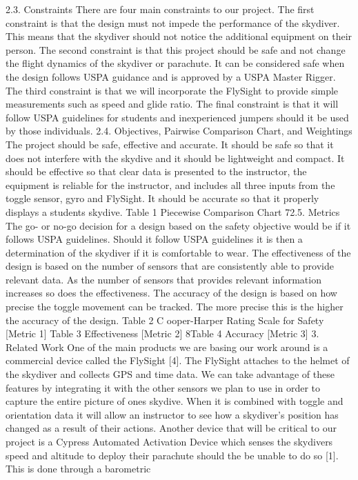 2.3.
Constraints
There are four main constraints to our project. The first constraint is that the design must not impede the performance
of the skydiver. This means that the skydiver should not notice the additional equipment on their person. The second
constraint is that this project should be safe and not change the flight dynamics of the skydiver or parachute. It can be
considered safe when the design follows USPA guidance and is approved by a USPA Master Rigger. The third constraint
is that we will incorporate the FlySight to provide simple measurements such as speed and glide ratio. The final
constraint is that it will follow USPA guidelines for students and inexperienced jumpers should it be used by those
individuals.
2.4.
Objectives, Pairwise Comparison Chart, and Weightings
The project should be safe, effective and accurate. It should be safe so that it does not interfere with the skydive and it
should be lightweight and compact. It should be effective so that clear data is presented to the instructor, the
equipment is reliable for the instructor, and includes all three inputs from the toggle sensor, gyro and FlySight. It should
be accurate so that it properly displays a students skydive.
Table 1 Piecewise Comparison Chart
72.5.
Metrics
The go- or no-go decision for a design based on the safety objective would be if it follows USPA guidelines. Should it
follow USPA guidelines it is then a determination of the skydiver if it is comfortable to wear. The effectiveness of the
design is based on the number of sensors that are consistently able to provide relevant data. As the number of sensors
that provides relevant information increases so does the effectiveness. The accuracy of the design is based on how
precise the toggle movement can be tracked. The more precise this is the higher the accuracy of the design.
Table 2 C
ooper-Harper Rating Scale for Safety [Metric 1]
Table 3 Effectiveness [Metric 2]
8Table 4 Accuracy [Metric 3]
3. Related Work
One of the main products we are basing our work around is a commercial device called the FlySight [4]. The FlySight
attaches to the helmet of the skydiver and collects GPS and time data. We can take advantage of these features by
integrating it with the other sensors we plan to use in order to capture the entire picture of ones skydive. When it is
combined with toggle and orientation data it will allow an instructor to see how a skydiver’s position has changed as a
result of their actions.
Another device that will be critical to our project is a Cypress Automated Activation Device which senses the skydivers
speed and altitude to deploy their parachute should the be unable to do so [1]. This is done through a barometric
